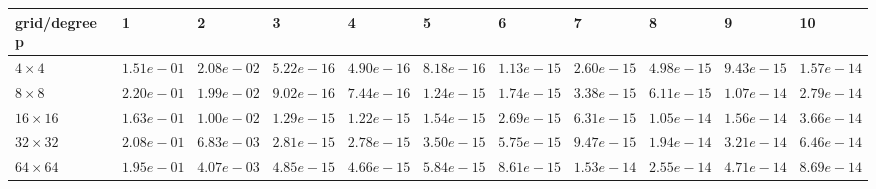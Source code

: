\begin{tabular}{lllllllllll}
\hline
 grid/degree p   & 1          & 2          & 3          & 4          & 5          & 6          & 7          & 8          & 9          & 10         \\
\hline
 $4 \times 4$    & $1.51e-01$ & $2.08e-02$ & $5.22e-16$ & $4.90e-16$ & $8.18e-16$ & $1.13e-15$ & $2.60e-15$ & $4.98e-15$ & $9.43e-15$ & $1.57e-14$ \\
 $8 \times 8$    & $2.20e-01$ & $1.99e-02$ & $9.02e-16$ & $7.44e-16$ & $1.24e-15$ & $1.74e-15$ & $3.38e-15$ & $6.11e-15$ & $1.07e-14$ & $2.79e-14$ \\
 $16 \times 16$  & $1.63e-01$ & $1.00e-02$ & $1.29e-15$ & $1.22e-15$ & $1.54e-15$ & $2.69e-15$ & $6.31e-15$ & $1.05e-14$ & $1.56e-14$ & $3.66e-14$ \\
 $32 \times 32$  & $2.08e-01$ & $6.83e-03$ & $2.81e-15$ & $2.78e-15$ & $3.50e-15$ & $5.75e-15$ & $9.47e-15$ & $1.94e-14$ & $3.21e-14$ & $6.46e-14$ \\
 $64 \times 64$  & $1.95e-01$ & $4.07e-03$ & $4.85e-15$ & $4.66e-15$ & $5.84e-15$ & $8.61e-15$ & $1.53e-14$ & $2.55e-14$ & $4.71e-14$ & $8.69e-14$ \\
\hline
\end{tabular}